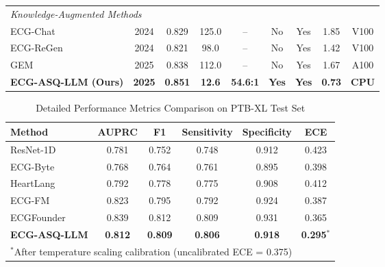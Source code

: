 \documentclass[journal]{IEEEtran}
\begin{document}
\begin{table*}[!t]
\begin{tabular}{lcccccccc}
\midrule
\multicolumn{9}{l}{\textit{Knowledge-Augmented Methods}} \\
ECG-Chat~\cite{Chen2024} & 2024 & 0.829 & 125.0 & -- & No & Yes & 1.85 & V100 \\
ECG-ReGen~\cite{Liu2024} & 2024 & 0.821 & 98.0 & -- & No & Yes & 1.42 & V100 \\
GEM~\cite{Kim2025} & 2025 & 0.838 & 112.0 & -- & No & Yes & 1.67 & A100 \\
\midrule
\textbf{ECG-ASQ-LLM (Ours)} & \textbf{2025} & \textbf{0.851} & \textbf{12.6} & \textbf{54.6:1} & \textbf{Yes} & \textbf{Yes} & \textbf{0.73} & \textbf{CPU} \\
\bottomrule
\end{tabular}
\end{table*}

\begin{table}[!t]
\centering
\caption{Detailed Performance Metrics Comparison on PTB-XL Test Set}
\label{tab:detailed_metrics}
\begin{tabular}{lccccc}
\toprule
\textbf{Method} & \textbf{AUPRC} & \textbf{F1} & \textbf{Sensitivity} & \textbf{Specificity} & \textbf{ECE} \\
\midrule
ResNet-1D & 0.781 & 0.752 & 0.748 & 0.912 & 0.423 \\
ECG-Byte & 0.768 & 0.764 & 0.761 & 0.895 & 0.398 \\
HeartLang & 0.792 & 0.778 & 0.775 & 0.908 & 0.412 \\
ECG-FM & 0.823 & 0.795 & 0.792 & 0.924 & 0.387 \\
ECGFounder & 0.839 & 0.812 & 0.809 & 0.931 & 0.365 \\
\midrule
\textbf{ECG-ASQ-LLM} & \textbf{0.812} & \textbf{0.809} & \textbf{0.806} & \textbf{0.918} & \textbf{0.295}$^*$ \\
\bottomrule
\multicolumn{6}{l}{\scriptsize $^*$After temperature scaling calibration (uncalibrated ECE = 0.375)} \\
\end{tabular}
\end{table}
\end{document}
